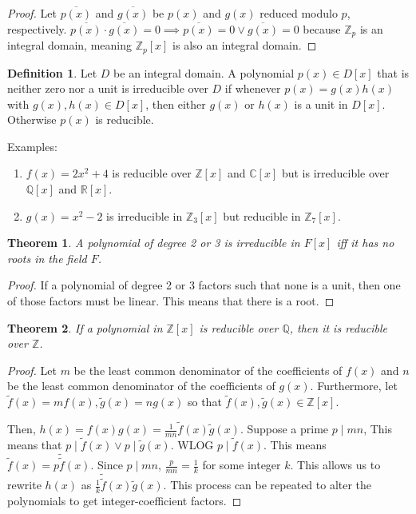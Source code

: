 \documentclass{article}
\theoremstyle{definition}
\newtheorem{definition}{Definition}
\theoremstyle{plain}
\newtheorem{theorem}{Theorem}
\theoremstyle{corollary}
\theoremstyle{lemma}
\begin{document}
\begin{proof}
    Let $\overline{p(x)}$ and $\overline{g(x)}$ be $p(x)$ and $g(x)$ reduced modulo $p$, respectively. $\overline{p(x)}\cdot\overline{g(x)}=0\implies\overline{p(x)}=0\lor\overline{g(x)}=0$ because $\mathbb{Z}_p$ is an integral domain, meaning $\mathbb{Z}_p[x]$ is also an integral domain.
\end{proof}

\begin{definition}
    Let $D$ be an integral domain. A polynomial $p(x)\in D[x]$ that is neither zero nor a unit is irreducible over $D$ if whenever $p(x)=g(x)h(x)$ with $g(x),h(x)\in D[x]$, then either $g(x)$ or $h(x)$ is a unit in $D[x]$. Otherwise $p(x)$ is reducible.
\end{definition}

Examples:
\begin{enumerate}
    \item $f(x)=2x^2+4$ is reducible over $\mathbb{Z}[x]$ and $\mathbb{C}[x]$ but is irreducible over $\mathbb{Q}[x]$ and $\mathbb{R}[x]$.
    \item $g(x)=x^2-2$ is irreducible in $\mathbb{Z}_3[x]$ but reducible in $\mathbb{Z}_7[x]$.
\end{enumerate}

\begin{theorem}
    A polynomial of degree 2 or 3 is irreducible in $F[x]$ iff it has no roots in the field $F$.
\end{theorem}

\begin{proof}
    If a polynomial of degree 2 or 3 factors such that none is a unit, then one of those factors must be linear. This means that there is a root.
\end{proof}

\begin{theorem}
    If a polynomial in $\mathbb{Z}[x]$ is reducible over $\mathbb{Q}$, then it is reducible over $\mathbb{Z}$.
\end{theorem}

\begin{proof}
    Let $m$ be the least common denominator of the coefficients of $f(x)$  and $n$ be the least common denominator of the coefficients of $g(x)$.
    Furthermore, let $\tilde{f}(x)=mf(x),\tilde{g}(x)=ng(x)$ so that $\tilde{f}(x),\tilde{g}(x)\in\mathbb{Z}[x]$.

    Then, $h(x)=f(x)g(x)=\frac1{mn}\tilde{f}(x)\tilde{g}(x)$. Suppose a prime $p\mid mn$, This means that $p\mid\tilde{f}(x)\lor p\mid\tilde{g}(x)$. WLOG $p\mid\tilde{f}(x)$. This means $\tilde{f}(x)=p\tilde{\tilde{f}}(x)$. Since $p\mid mn$, $\frac p{mn}=\frac1k$ for some integer $k$. This allows us to rewrite $h(x)$ as $\frac1k\tilde{\tilde{f}}(x)\tilde{g}(x)$. This process can be repeated to alter the polynomials to get integer-coefficient factors.
\end{proof}
\end{document}
